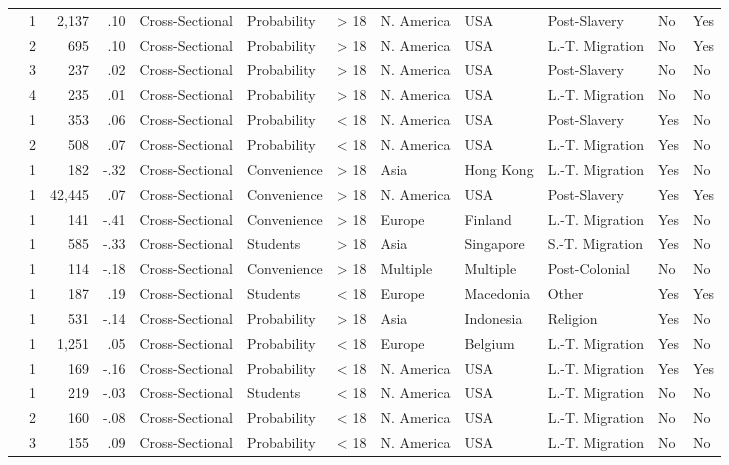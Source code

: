 \documentclass[10pt, letterpaper]{article}
\begin{document}
\begin{landscape}
\begin{xltabular}{650pt}{Xrrrllrlllll}
\cite{1407} & 1 & 2,137 & .10 & Cross-Sectional & Probability & > 18 & N. America & USA & Post-Slavery & No & Yes\\
 & 2 & 695 & .10 & Cross-Sectional & Probability & > 18 & N. America & USA & L.-T. Migration & No & Yes\\
\cite{1494} & 3 & 237 & .02 & Cross-Sectional & Probability & > 18 & N. America & USA & Post-Slavery & No & No\\
 & 4 & 235 & .01 & Cross-Sectional & Probability & > 18 & N. America & USA & L.-T. Migration & No & No\\
\cite{324} & 1 & 353 & .06 & Cross-Sectional & Probability & < 18 & N. America & USA & Post-Slavery & Yes & No\\
 & 2 & 508 & .07 & Cross-Sectional & Probability & < 18 & N. America & USA & L.-T. Migration & Yes & No\\
\cite{609} & 1 & 182 & -.32 & Cross-Sectional & Convenience & > 18 & Asia & Hong Kong & L.-T. Migration & Yes & No\\
\cite{2001} & 1 & 42,445 & .07 & Cross-Sectional & Convenience & > 18 & N. America & USA & Post-Slavery & Yes & Yes\\
\cite{2341} & 1 & 141 & -.41 & Cross-Sectional & Convenience & > 18 & Europe & Finland & L.-T. Migration & Yes & No\\
\cite{19} & 1 & 585 & -.33 & Cross-Sectional & Students & > 18 & Asia & Singapore & S.-T. Migration & Yes & No\\
\cite{303} & 1 & 114 & -.18 & Cross-Sectional & Convenience & > 18 & Multiple & Multiple & Post-Colonial & No & No\\
\cite{856} & 1 & 187 & .19 & Cross-Sectional & Students & < 18 & Europe & Macedonia & Other & Yes & Yes\\
\cite{1411} & 1 & 531 & -.14 & Cross-Sectional & Probability & > 18 & Asia & Indonesia & Religion & Yes & No\\
\cite{4002} & 1 & 1,251 & .05 & Cross-Sectional & Probability & < 18 & Europe & Belgium & L.-T. Migration & Yes & No\\
\cite{1525} & 1 & 169 & -.16 & Cross-Sectional & Probability & < 18 & N. America & USA & L.-T. Migration & Yes & Yes\\
\cite{830} & 1 & 219 & -.03 & Cross-Sectional & Students & < 18 & N. America & USA & L.-T. Migration & No & No\\
 & 2 & 160 & -.08 & Cross-Sectional & Probability & < 18 & N. America & USA & L.-T. Migration & No & No\\
 & 3 & 155 & .09 & Cross-Sectional & Probability & < 18 & N. America & USA & L.-T. Migration & No & No\\

\end{xltabular}
\end{landscape}
\end{document}
